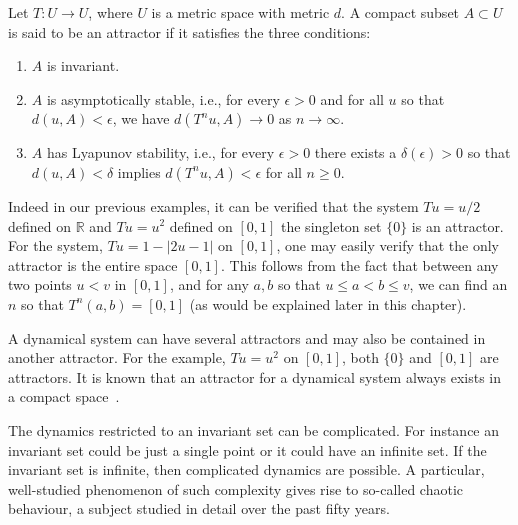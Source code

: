 \begin{Definition}
  [\bf Attractor]\label{Dfn_Attractor}\rm
  Let $T: U \to U$, where $U$  is a metric space with metric $d$. A compact subset $A \subset U$ is said to be an attractor if it satisfies the three conditions: 
  \vspace{-8mm}
  \begin{enumerate}
	\item $A$ is invariant. 
	\item $A$ is asymptotically stable, i.e., for every $\epsilon > 0$ and for all $u$ so that $d(u,A) < \epsilon$, we have $d(T^nu,A) \to 0$ as $n\to \infty$. 
	\item $A$ has Lyapunov stability, i.e., for every $\epsilon > 0$  there exists a $\delta(\epsilon) > 0$ so that $d(u,A) < \delta$ implies $d(T^nu,A) < \epsilon$ for all $n\ge 0$.  
\end{enumerate}
\end{Definition} 

Indeed in our previous examples, it can be verified that the system  $Tu=u/2$ defined on  $\mathbb{R}$ and $Tu=u^2$ defined on $[0,1]$  the singleton set $\{0\}$ is an attractor.  For the system,  $Tu=1-|2u-1|$ on $[0,1]$, one may easily verify that the only attractor is the entire space $[0,1]$. This follows from the fact that between any two points $u< v$ in $[0,1]$, and for any $a,b$ so that $u\le a < b \le v$, we can find an $n$ so that $T^n(a,b)=[0,1]$ (as would be explained later in this chapter). 

A dynamical system can have several attractors and may also be contained in another attractor. For the example, $Tu =u^2$ on $[0,1]$, both $\{0\}$ and $[0,1]$ are attractors. It is known that an attractor for a dynamical system always exists in a compact space~\cite{Milnor1985}.

The dynamics restricted to an invariant set can be complicated. For instance an invariant set could be just a single point or it could have an infinite set. If the invariant set is infinite, then complicated dynamics are possible. A particular, well-studied phenomenon of such complexity gives rise to so-called chaotic behaviour, a subject studied in detail over the past fifty years.


